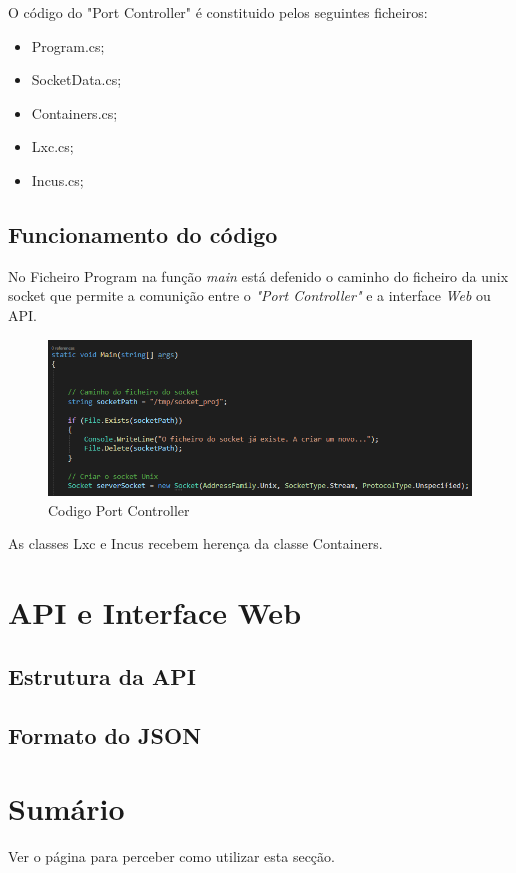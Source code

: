 O código do "Port Controller" é constituido pelos seguintes ficheiros:

\begin{itemize}
    \item Program.cs;
    \item SocketData.cs;
    \item Containers.cs;
    \item Lxc.cs;
    \item Incus.cs;
\end{itemize}

\subsection{Funcionamento do código}


No Ficheiro Program na função \textit{main} está defenido o caminho do ficheiro 
da unix socket que permite a comunição entre o \textit{"Port Controller"} e 
a interface \textit{Web} ou API.

\begin{figure}
\begin{center}
\includegraphics[width=13cm]{figs/codigo_pc.png}
\caption{Codigo Port Controller}
\end{center}
\end{figure}




As classes Lxc e Incus recebem herença da classe Containers.


\section{API e Interface Web}

\subsection{Estrutura da API}

\subsection{Formato do JSON}


\section*{Sumário}

Ver o  página \pageref{sec:intro_summary} para perceber como utilizar esta secção.


